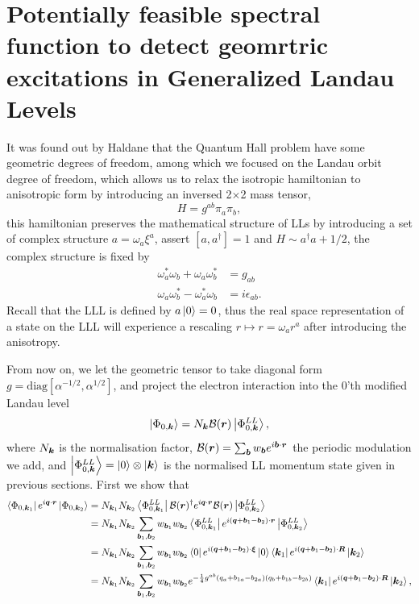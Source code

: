\documentclass[%
nofootinbib,
 amsmath,amssymb,
 aps,onecolumn,
prb
]{revtex4-2}
\newcommand{\mB}{\mathcal{B}}
\begin{document}
\section{Potentially feasible spectral function to detect geomrtric excitations in Generalized Landau Levels}
It was found out by Haldane that the Quantum Hall problem have some geometric degrees of freedom, among which we focused on the Landau orbit degree of freedom, which allows us to relax the isotropic hamiltonian to anisotropic form by 
introducing an inversed 2$\times$2 mass tensor,
\begin{equation}
    H=g^{ab}\pi_a\pi_b,
\end{equation} 
this hamiltonian preserves the mathematical structure of LLs by introducing a set of complex structure $a=\omega_a \xi^a$, assert $[a,a^\dag]=1$ and $H\sim a^\dag a+1/2$, the complex structure is fixed by 
\begin{align}
    \omega_a^*\omega_b+\omega_a\omega_b^* &=g_{ab} \nonumber\\ 
    \omega_a\omega_b^*-\omega_a^*\omega_b &=i\epsilon_{ab}.
\end{align}
Recall that the LLL is defined by $a\ket{0}=0$, thus the real space representation of a state on the LLL will experience a rescaling $r\mapsto r=\omega_a r^a$ after introducing the anisotropy.\par{}
From now on, we let the geometric tensor to take diagonal form $g=\text{diag}[\alpha^{-1/2},\alpha^{1/2}]$, and project the electron interaction into the 0'th modified Landau level 
\begin{equation}
    \ket{\Phi_{0,\vb*{k}}}=N_{\vb*{k}}\mB(\vb*{r})\ket{\Phi_{0,\vb*{k}}^{LL}},
\end{equation}  
where $N_{\vb*{k}}$ is the normalisation factor, $\mB(\vb*{r})=\sum_{\vb*{b}}w_{\vb*{b}}e^{i\vb*{b}\cdot\vb*{r}}$ the periodic modulation we add, and $\ket{\Phi_{0,\vb*{k}}^{LL}}=\ket{0}\otimes\ket{\vb*{k}}$ is the normalised LL momentum state given in previous sections.
First we show that 
\begin{align}
    \bra{\Phi_{0,\vb*{k}_1}}e^{i\vb*{q}\cdot\vb*{r}}\ket{\Phi_{0,\vb*{k}_2}}&=N_{\vb*{k}_1}N_{\vb*{k}_2}\bra{\Phi_{0,\vb*{k}_1}^{LL}}\mB(\vb*{r})^\dag e^{i\vb*{q}\cdot\vb*{r}}\mB(\vb*{r})\ket{\Phi_{0,\vb*{k}_2}^{LL}}\nonumber\\ 
    &=N_{\vb*{k}_1}N_{\vb*{k}_2}\sum_{\vb*{b}_1,\vb*{b}_2} w_{\vb*{b}_1}w_{\vb*{b}_2}\bra{\Phi_{0,\vb*{k}_1}^{LL}}e^{i(\vb*{q}+\vb*{b}_1-\vb*{b}_2)\cdot\vb*{r}}\ket{\Phi_{0,\vb*{k}_2}^{LL}} \nonumber\\ 
    &=N_{\vb*{k}_1}N_{\vb*{k}_2}\sum_{\vb*{b}_1,\vb*{b}_2} w_{\vb*{b}_1}w_{\vb*{b}_2}\bra{0}e^{i(\vb*{q}+\vb*{b}_1-\vb*{b}_2)\cdot\vb*{\xi}}\ket{0}\bra{\vb*{k}_1}e^{i(\vb*{q}+\vb*{b}_1-\vb*{b}_2)\cdot\vb*{R}}\ket{\vb*{k}_2}  \nonumber\\ 
    &=N_{\vb*{k}_1}N_{\vb*{k}_2}\sum_{\vb*{b}_1,\vb*{b}_2} w_{\vb*{b}_1}w_{\vb*{b}_2}e^{-\frac{1}{4}g^{ab}(q_a+b_{1a}-b_{2a})(q_b+b_{1b}-b_{2b})}\bra{\vb*{k}_1}e^{i(\vb*{q}+\vb*{b}_1-\vb*{b}_2)\cdot\vb*{R}}\ket{\vb*{k}_2},
\end{align}
\end{document}
